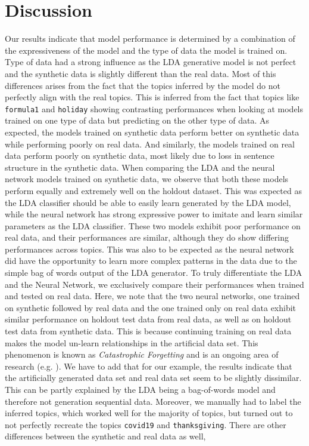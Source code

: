 \documentclass[11pt]{article}
\begin{document}
\section{Discussion}
Our results indicate that model performance is determined by a combination of the expressiveness of the model and the type of data the model is trained on. Type of data had a strong influence as the LDA generative model is not perfect and the synthetic data is slightly different than the real data. Most of this differences arises from the fact that the topics inferred by the model do not perfectly align with the real topics. This is inferred from the fact that topics like \texttt{formula1} and \texttt{holiday} showing contrasting performances when looking at models trained on one type of data but predicting on the other type of data. As expected, the models trained on synthetic data perform better on synthetic data while performing poorly on real data. And similarly, the models trained on real data perform poorly on synthetic data, most likely due to loss in sentence structure in the synthetic data. When comparing the LDA and the neural network models trained on synthetic data, we observe that both these models perform equally and extremely well on the holdout dataset. This was expected as the LDA classifier should be able to easily learn generated by the LDA model, while the neural network has strong expressive power to imitate and learn similar parameters as the LDA classifier. These two models exhibit poor performance on real data, and their performances are similar, although they do show differing performances across topics. This was also to be expected as the neural network did have the opportunity to learn more complex patterns in the data due to the simple bag of words output of the LDA generator. To truly differentiate the LDA and the Neural Network, we exclusively compare their performances when trained and tested on real data. Here, we note that the two neural networks, one trained on synthetic followed by real data and the one trained only on real data exhibit similar performance on holdout test data from real data, as well as on holdout test data from synthetic data. This is because continuing training on real data makes the model un-learn relationships in the artificial data set. This phenomenon is known as \emph{Catastrophic Forgetting} and is an ongoing area of research (e.g. \cite{kaushik2021understanding}). We have to add that for our example, the results indicate that the artificially generated data set and real data set seem to be slightly dissimilar. This can be partly explained by the LDA being a bag-of-words model and therefore not generation sequential data. Moreover, we manually had to label the inferred topics, which worked well for the majority of topics, but turned out to not perfectly recreate the topics \texttt{covid19} and \texttt{thanksgiving}. There are other differences between the synthetic and real data as well, 
\end{document}
